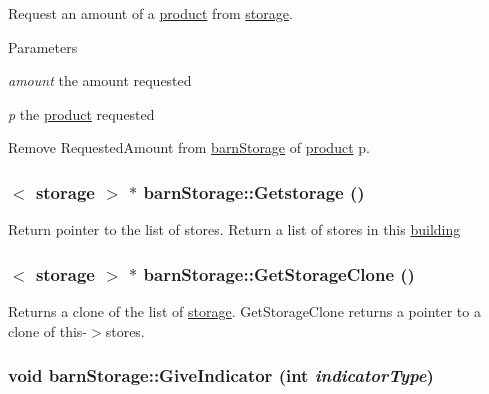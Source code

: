 Request an amount of a \hyperlink{classproduct}{product} from \hyperlink{classstorage}{storage}. 
\begin{DoxyParams}{Parameters}
\item[{\em amount}]the amount requested \item[{\em p}]the \hyperlink{classproduct}{product} requested\end{DoxyParams}
Remove RequestedAmount from \hyperlink{classbarn_storage}{barnStorage} of \hyperlink{classproduct}{product} p. \hypertarget{classbarn_storage_a8cae788f50f74e49bbaa5c1fbfc397a7}{
\subsubsection[{Getstorage}]{$<$ {\bf storage} $>$ $\ast$ barnStorage::Getstorage ()}}
\label{classbarn_storage_a8cae788f50f74e49bbaa5c1fbfc397a7}


Return pointer to the list of stores. Return a list of stores in this \hyperlink{classbuilding}{building} \hypertarget{classbarn_storage_a8d42662925ead9f3bdd9dfdd3ade9c46}{
\subsubsection[{GetStorageClone}]{$<$ {\bf storage} $>$ $\ast$ barnStorage::GetStorageClone ()}}
\label{classbarn_storage_a8d42662925ead9f3bdd9dfdd3ade9c46}


Returns a clone of the list of \hyperlink{classstorage}{storage}. GetStorageClone returns a pointer to a clone of this-\/$>$stores. \hypertarget{classbarn_storage_add4a5961a82e36e01d6905e01ac274de}{
\subsubsection[{GiveIndicator}]{\setlength{\rightskip}{0pt plus 5cm}void barnStorage::GiveIndicator (int {\em indicatorType})}}
\label{classbarn_storage_add4a5961a82e36e01d6905e01ac274de}


